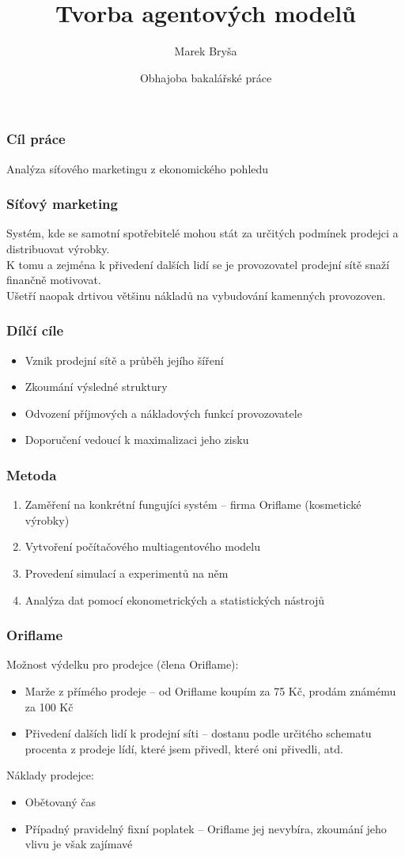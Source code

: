 \documentclass[xcolor=dvipsnames]{beamer}
\title{Tvorba agentových modelů}
\author{Marek Bryša}
\institute
{
Masarykova Univerzita\\
Přírodovědecká fakulta\\
Ústav matematiky a statistiky
}
\date{Obhajoba bakalářské práce}
\begin{document}
  \frame{\titlepage}
  \begin{frame}
    \frametitle{Cíl práce}
    Analýza síťového marketingu z ekonomického pohledu\\
  \end{frame}
  \begin{frame}
    \frametitle{Síťový marketing}
    Systém, kde se samotní spotřebitelé mohou stát za určitých podmínek prodejci
a distribuovat výrobky.\\
    K tomu a zejména k přivedení dalších lidí se je provozovatel prodejní sítě snaží finančně motivovat.\\
    Ušetří naopak drtivou většinu nákladů na vybudování kamenných provozoven. 
  \end{frame}
  \begin{frame}
    \frametitle{Dílčí cíle}
    \begin{itemize}
      \item Vznik prodejní sítě a průběh jejího šíření
      \item Zkoumání výsledné struktury
      \item Odvození příjmových a nákladových funkcí provozovatele
      \item Doporučení vedoucí k maximalizaci jeho zisku
    \end{itemize}
  \end{frame}
  \begin{frame}
    \frametitle{Metoda}
    \begin{enumerate}
      \item Zaměření na konkrétní fungujíci systém -- firma Oriflame (kosmetické výrobky)
      \item Vytvoření počítačového multiagentového modelu
      \item Provedení simulací a experimentů na něm
      \item Analýza dat pomocí ekonometrických a statistických nástrojů

    \end{enumerate}

  \end{frame}
  \begin{frame}
    \frametitle{Oriflame}
    Možnost výdelku pro prodejce (člena Oriflame):
    \begin{itemize}
      \item Marže z přímého prodeje -- od Oriflame koupím za 75 Kč, prodám známému za 100 Kč
      \item Přivedení dalších lidí k prodejní síti -- dostanu podle určitého schematu procenta z prodeje lídí, které jsem přivedl, které oni přivedli, atd.
    \end{itemize}
    Náklady prodejce:
    \begin{itemize}
      \item Obětovaný čas
      \item Případný pravidelný fixní poplatek -- Oriflame jej nevybíra, zkoumání jeho vlivu je však zajímavé
    \end{itemize} 
  \end{frame}
\end{document}
